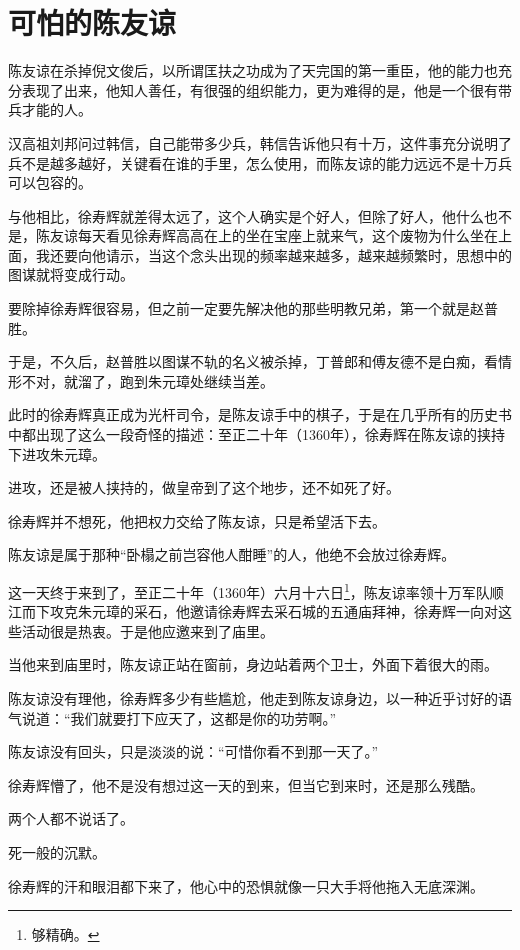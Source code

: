 \section{可怕的陈友谅}
\ifnum{}
	\begin{multicols}{\theparacolNo}
		\fi
		陈友谅在杀掉倪文俊后，以所谓匡扶之功成为了天完国的第一重臣，他的能力也充分表现了出来，他知人善任，有很强的组织能力，更为难得的是，他是一个很有带兵才能的人。

		汉高祖刘邦问过韩信，自己能带多少兵，韩信告诉他只有十万，这件事充分说明了兵不是越多越好，关键看在谁的手里，怎么使用，而陈友谅的能力远远不是十万兵可以包容的。

		与他相比，徐寿辉就差得太远了，这个人确实是个好人，但除了好人，他什么也不是，陈友谅每天看见徐寿辉高高在上的坐在宝座上就来气，这个废物为什么坐在上面，我还要向他请示，当这个念头出现的频率越来越多，越来越频繁时，思想中的图谋就将变成行动。

		要除掉徐寿辉很容易，但之前一定要先解决他的那些明教兄弟，第一个就是赵普胜。

		于是，不久后，赵普胜以图谋不轨的名义被杀掉，丁普郎和傅友德不是白痴，看情形不对，就溜了，跑到朱元璋处继续当差。

		此时的徐寿辉真正成为光杆司令，是陈友谅手中的棋子，于是在几乎所有的历史书中都出现了这么一段奇怪的描述：至正二十年（1360年），徐寿辉在陈友谅的挟持下进攻朱元璋。

		进攻，还是被人挟持的，做皇帝到了这个地步，还不如死了好。

		徐寿辉并不想死，他把权力交给了陈友谅，只是希望活下去。

		陈友谅是属于那种“卧榻之前岂容他人酣睡”的人，他绝不会放过徐寿辉。

		这一天终于来到了，至正二十年（1360年）六月十六日\footnote{够精确。}，陈友谅率领十万军队顺江而下攻克朱元璋的采石，他邀请徐寿辉去采石城的五通庙拜神，徐寿辉一向对这些活动很是热衷。于是他应邀来到了庙里。

		当他来到庙里时，陈友谅正站在窗前，身边站着两个卫士，外面下着很大的雨。

		陈友谅没有理他，徐寿辉多少有些尴尬，他走到陈友谅身边，以一种近乎讨好的语气说道：“我们就要打下应天了，这都是你的功劳啊。”

		陈友谅没有回头，只是淡淡的说：“可惜你看不到那一天了。”

		徐寿辉懵了，他不是没有想过这一天的到来，但当它到来时，还是那么残酷。

		两个人都不说话了。

		死一般的沉默。

		徐寿辉的汗和眼泪都下来了，他心中的恐惧就像一只大手将他拖入无底深渊。


\end{multicols}
